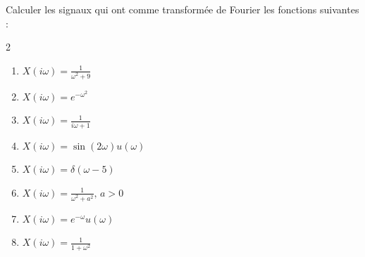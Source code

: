 \begin{exercise}
    Calculer les signaux qui ont comme transformée de Fourier les fonctions suivantes :
    \begin{multicols}{2}
    \begin{enumerate}[label=(\alph*)]
        \item $X(i\omega) = \frac{1}{\omega^2 + 9}$
        \item $X(i\omega) = e^{-\omega^2}$
        \item $X(i\omega) = \frac{1}{i\omega + 1}$
        \item $X(i\omega) = \sin(2\omega) u(\omega)$
        \item $X(i\omega) = \delta(\omega - 5)$
        \item $X(i\omega) = \frac{1}{\omega^2 + a^2}, \, a > 0$
        \item $X(i\omega) = e^{-\omega} u(\omega)$
        \item $X(i\omega) = \frac{1}{1 + \omega^2}$
    \end{enumerate}
    \end{multicols}
\end{exercise}



